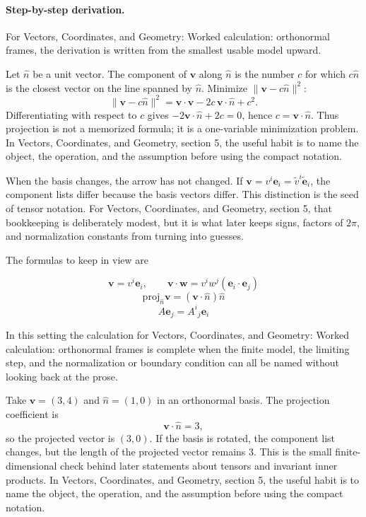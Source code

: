 \paragraph{Step-by-step derivation.}

For Vectors, Coordinates, and Geometry: Worked calculation: orthonormal frames, the derivation is written from the smallest usable model upward.

Let \(\hat n\) be a unit vector.  The component of \(\bm v\) along \(\hat n\) is the number \(c\) for which \(c\hat n\) is the closest vector on the line spanned by \(\hat n\).  Minimize \(\|\bm v-c\hat n\|^2\):
\[
  \|\bm v-c\hat n\|^2=\bm v\cdot\bm v-2c\,\bm v\cdot\hat n+c^2.
\]
Differentiating with respect to \(c\) gives \(-2\bm v\cdot\hat n+2c=0\), hence \(c=\bm v\cdot\hat n\).  Thus projection is not a memorized formula; it is a one-variable minimization problem.  In Vectors, Coordinates, and Geometry, section 5, the useful habit is to name the object, the operation, and the assumption before using the compact notation.

When the basis changes, the arrow has not changed.  If \(\bm v=v^i\bm e_i=\tilde v^i\tilde{\bm e}_i\), the component lists differ because the basis vectors differ.  This distinction is the seed of tensor notation.  For Vectors, Coordinates, and Geometry, section 5, that bookkeeping is deliberately modest, but it is what later keeps signs, factors of \(2\pi\), and normalization constants from turning into guesses.

The formulas to keep in view are

\[
  \bm v=v^i\bm e_i,\qquad \bm v\cdot\bm w=v^iw^j(\bm e_i\cdot\bm e_j)
\]
\[
  \mathrm{proj}_{\hat n}\bm v=(\bm v\cdot\hat n)\hat n
\]
\[
  A\bm e_j=A^i{}_j\bm e_i
\]

In this setting the calculation for Vectors, Coordinates, and Geometry: Worked calculation: orthonormal frames is complete when the finite model, the limiting step, and the normalization or boundary condition can all be named without looking back at the prose.




\begin{example}
Take \(\bm v=(3,4)\) and \(\hat n=(1,0)\) in an orthonormal basis.  The projection coefficient is
\[
  \bm v\cdot\hat n=3,
\]
so the projected vector is \((3,0)\).  If the basis is rotated, the component list changes, but the length of the projected vector remains \(3\).  This is the small finite-dimensional check behind later statements about tensors and invariant inner products.  In Vectors, Coordinates, and Geometry, section 5, the useful habit is to name the object, the operation, and the assumption before using the compact notation.
\end{example}



